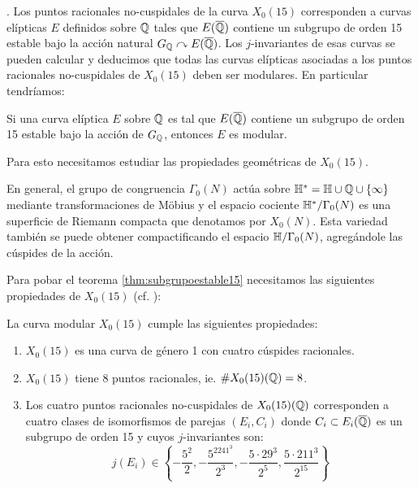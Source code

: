 \documentclass[../../tesis_maestria]{subfiles}
\begin{document}
. Los puntos racionales no-cuspidales de
la curva $X_0(15)$ corresponden a curvas el\'ipticas $E$ definidos sobre $\mathbb{Q}$ tales que
$E(\overline{\mathbb{Q}})$ contiene un subgrupo de orden 15 estable bajo la acci\'on natural
$G_{\mathbb{Q}}\curvearrowright E(\overline{\mathbb{Q}})$. Los $j$-invariantes de esas curvas se pueden calcular y deducimos que
todas las curvas el\'ipticas asociadas a los puntos racionales no-cuspidales de $X_0(15)$ deben
ser modulares. En particular tendr\'iamos:

\begin{thm}\label{thm:subgrupoestable15}
  Si una curva el\'iptica $E$ sobre $\mathbb{Q}$ es tal que $E(\overline{\mathbb{Q}})$ contiene un subgrupo de
  orden 15 estable bajo la acci\'on de $G_{\mathbb{Q}}$, entonces $E$ es modular.
\end{thm}

Para esto necesitamos
estudiar las propiedades geom\'etricas de $X_0(15)$.

En general, el grupo de congruencia $\Gamma_0(N)$ act\'ua sobre $\mathbb{H}^*=\mathbb{H}\cup\mathbb{Q}\cup\{\infty\}$
mediante transformaciones de M\"obius y el espacio cociente $\mathbb{H}^*/\Gamma_0(N)$ es una superficie
de Riemann compacta que denotamos por $X_0(N)$. Esta variedad tambi\'en se puede obtener
compactificando el espacio $\mathbb{H}/\Gamma_0(N)$, agreg\'andole las c\'uspides de la acci\'on.

Para pobar el teorema \ref{thm:subgrupoestable15} necesitamos las siguientes propiedades de
$X_0(15)$ (cf. \cite[cap\'itulo XVI, \S 2, Lema 9]{CornellMFAFLT}):

\begin{prop}\label{prop:propiedadesx015}
  La curva modular $X_0(15)$ cumple las siguientes propiedades:
  \begin{enumerate}[label=\emph{\roman*})]
  \item $X_0(15)$ es una curva de g\'enero 1 con cuatro c\'uspides racionales.
  \item $X_0(15)$ tiene 8 puntos racionales, ie. $\# X_0(15)(\mathbb{Q})=8$.
  \item Los cuatro puntos racionales no-cuspidales de $X_0(15)(\mathbb{Q})$ corresponden a cuatro
    clases de isomorfismos de parejas $(E_i,C_i)$ donde $C_i\subset E_i(\overline{\mathbb{Q}})$ es un
    subgrupo de orden 15 y cuyos $j$-invariantes son:
    \[
      j(E_i)\in\left\{
        -\frac{5^2}{2},-\frac{5^2241^3}{2^3},-\frac{5\cdot 29^3}{2^5},\frac{5\cdot 211^3}{2^{15}}
      \right\}
    \]
    
  \end{enumerate}
\end{prop}
\end{document}

